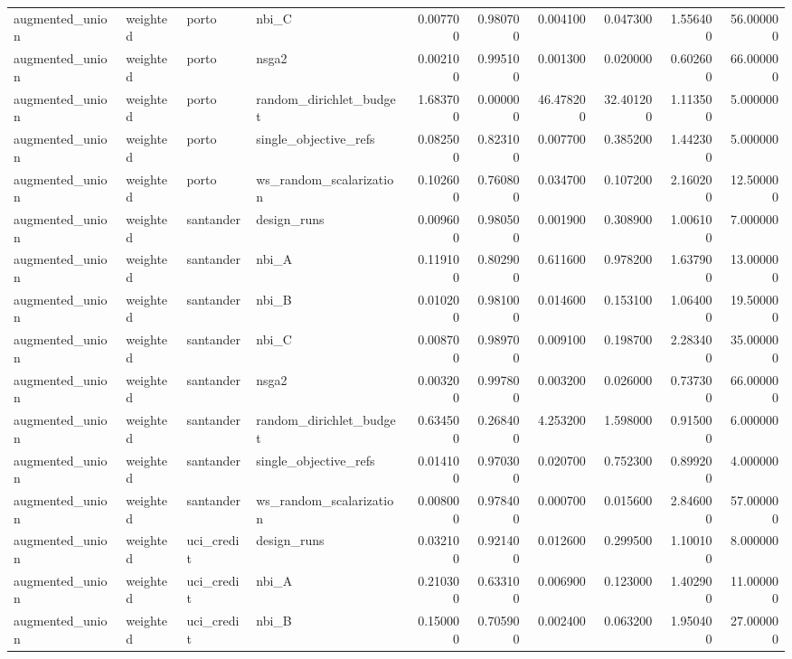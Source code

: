 \begin{landscape}
\begin{longtable}{llllrrrrrr}
augmented\_union & weighted & porto & nbi\_C & 0.007700 & 0.980700 & 0.004100 & 0.047300 & 1.556400 & 56.000000 \\
augmented\_union & weighted & porto & nsga2 & 0.002100 & 0.995100 & 0.001300 & 0.020000 & 0.602600 & 66.000000 \\
augmented\_union & weighted & porto & random\_dirichlet\_budget & 1.683700 & 0.000000 & 46.478200 & 32.401200 & 1.113500 & 5.000000 \\
augmented\_union & weighted & porto & single\_objective\_refs & 0.082500 & 0.823100 & 0.007700 & 0.385200 & 1.442300 & 5.000000 \\
augmented\_union & weighted & porto & ws\_random\_scalarization & 0.102600 & 0.760800 & 0.034700 & 0.107200 & 2.160200 & 12.500000 \\
augmented\_union & weighted & santander & design\_runs & 0.009600 & 0.980500 & 0.001900 & 0.308900 & 1.006100 & 7.000000 \\
augmented\_union & weighted & santander & nbi\_A & 0.119100 & 0.802900 & 0.611600 & 0.978200 & 1.637900 & 13.000000 \\
augmented\_union & weighted & santander & nbi\_B & 0.010200 & 0.981000 & 0.014600 & 0.153100 & 1.064000 & 19.500000 \\
augmented\_union & weighted & santander & nbi\_C & 0.008700 & 0.989700 & 0.009100 & 0.198700 & 2.283400 & 35.000000 \\
augmented\_union & weighted & santander & nsga2 & 0.003200 & 0.997800 & 0.003200 & 0.026000 & 0.737300 & 66.000000 \\
augmented\_union & weighted & santander & random\_dirichlet\_budget & 0.634500 & 0.268400 & 4.253200 & 1.598000 & 0.915000 & 6.000000 \\
augmented\_union & weighted & santander & single\_objective\_refs & 0.014100 & 0.970300 & 0.020700 & 0.752300 & 0.899200 & 4.000000 \\
augmented\_union & weighted & santander & ws\_random\_scalarization & 0.008000 & 0.978400 & 0.000700 & 0.015600 & 2.846000 & 57.000000 \\
augmented\_union & weighted & uci\_credit & design\_runs & 0.032100 & 0.921400 & 0.012600 & 0.299500 & 1.100100 & 8.000000 \\
augmented\_union & weighted & uci\_credit & nbi\_A & 0.210300 & 0.633100 & 0.006900 & 0.123000 & 1.402900 & 11.000000 \\
augmented\_union & weighted & uci\_credit & nbi\_B & 0.150000 & 0.705900 & 0.002400 & 0.063200 & 1.950400 & 27.000000 \\

\end{longtable}
\end{landscape}

